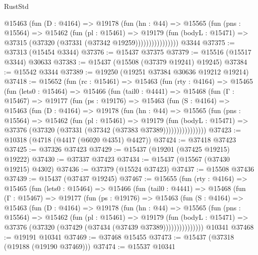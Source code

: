 \begin{lexlean}{RustStd}
\begin{coremodule}
                  @15463
                    (fun (D : @4164) =>
                    @19178
                      (fun (hn : @44) =>
                      @15565
                        (fun (pns : @15564) =>
                        @15462
                          (fun (pl : @15461) =>
                          @19179
                            (fun (bodyL : @15471) =>
                            @37315 (@37320 (@37331 (@37342 @19259))))))))))))))))
    @3344
@37375 := @37313 (@15454 @3344)
@37376 := @15437 @37375
@37379 := @15516 (@15517 @3344) @30633
@37383 := @15437 (@15508 (@37379 @19241) @19245)
@37384 := @15542 @3344
@37389 := @19250 (@19251 @37384 @30636 @19212 @19214)
@37418 := @15652
    (fun (rc : @15461) =>
    @15463
      (fun (rty : @4164) =>
      @15465
        (fun (lets0 : @15464) =>
        @15466
          (fun (tail0 : @4441) =>
          @15468
            (fun (Γ : @15467) =>
            @19177
              (fun (ps : @19176) =>
              @15463
                (fun (S : @4164) =>
                @15463
                  (fun (D : @4164) =>
                  @19178
                    (fun (hn : @44) =>
                    @15565
                      (fun (pns : @15564) =>
                      @15462
                        (fun (pl : @15461) =>
                        @19179
                          (fun (bodyL : @15471) =>
                          @37376 (@37320 (@37331 (@37342 (@37383 @37389))))))))))))))))
@37423 := @10318 (@4718 (@4417 (@6020 @4351) @4427))
@37424 := @37418 @37423
@37425 := @37326 @37423
@37429 := @15437 (@19201 (@37425 @19215) @19222)
@37430 := @37337 @37423
@37434 := @15437 (@15567 (@37430 @19215) @4302)
@37436 := @37379 (@15524 @37423)
@37437 := @15508 @37436
@37439 := @15437 (@37437 @19245)
@37467 := @15655
    (fun (rty : @4164) =>
    @15465
      (fun (lets0 : @15464) =>
      @15466
        (fun (tail0 : @4441) =>
        @15468
          (fun (Γ : @15467) =>
          @19177
            (fun (ps : @19176) =>
            @15463
              (fun (S : @4164) =>
              @15463
                (fun (D : @4164) =>
                @19178
                  (fun (hn : @44) =>
                  @15565
                    (fun (pns : @15564) =>
                    @15462
                      (fun (pl : @15461) =>
                      @19179
                        (fun (bodyL : @15471) =>
                        @37376 (@37320 (@37429 (@37434 (@37439 @37389)))))))))))))))
    @10341
@37468 := @19191 @10341
@37469 := @37468 @15455
@37473 := @15437 (@37318 (@19188 (@19190 @37469)))
@37474 := @15537 @10341

\end{coremodule}
\end{lexlean}
